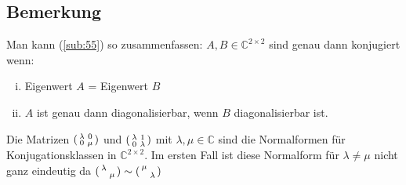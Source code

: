 \subsection[Bemerkung: Zusammenfassung von \ref{sub:55}]{Bemerkung} %
\label{sub:56}
Man kann (\ref{sub:55}) so zusammenfassen: $A,B \in \mathds{C}^{2 \times 2}  $ sind genau dann konjugiert wenn: 
\begin{enumerate}[(i)]
	\item Eigenwert $A$ = Eigenwert $B$
	\item $A$ ist genau dann diagonalisierbar, wenn $B$ diagonalisierbar ist.
\end{enumerate}
Die Matrizen $(\begin{smallmatrix}\lambda  & 0 \\ 0 & \mu  \end{smallmatrix})$ und $(\begin{smallmatrix}\lambda  & 1 \\ 0 & \lambda  \end{smallmatrix})$
mit $\lambda , \mu  \in \mathds{C}$ sind die Normalformen für Konjugationsklassen in $\mathds{C}^{2 \times 2}$. Im ersten Fall ist diese Normalform für $\lambda  \not= 
\mu$ nicht ganz eindeutig da 
$(\begin{smallmatrix}\lambda  &  \\  & \mu  \end{smallmatrix}) \sim (\begin{smallmatrix}\mu  &  \\  & \lambda  \end{smallmatrix})$

